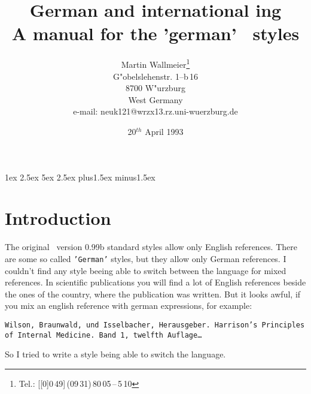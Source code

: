 

\def\tex{{\the\textfont0\TeX}}
\def\pLaTeX{{\the\textfont0 L\kern-.36em\raise.3ex\hbox{\the\scriptfont0 
A}\kern-.15em    T\kern-.1667em\lower.7ex\hbox{E}\kern-.125emX}}
\def\LaTeX{\protect\pLaTeX}
\def\pBibTeX{{\the\textfont0 B\hbox{\the\scriptfont0 IB}\kern-.1em\TeX}}
\def\BibTeX{\protect\pBibTeX}
\def\bibtex{\BibTeX}\def\tex{\TeX}
\def\latex{\LaTeX}
\def\dat#1{{\tt #1}}
\def\bsl{{\tt\char'134}}   %
\def\leerz{{\tt\char'040}} %
\def\affe{\char'100}       %
  
   
 
\hoffset=-1.0in \textwidth6.4in  
  \marginparpush1ex
 \headheight2.5ex \headsep5ex 
 
\parindent0pt \parskip2.5ex plus1.5ex minus1.5ex
\renewcommand{\arraystretch}{1.2}
\renewcommand{\baselinestretch}{1.1}
\def\footnoterule{\vfill\kern-3pt \hrule width \textwidth\kern 2.6pt}
\pagestyle{headings}
\newlength{\mylena}
\originalTeX\nonfrenchspacing



\title{German and international \bibtex ing\\A manual for the 'german' \bibtex\ styles}
\author{Martin Wallmeier\thanks{Tel.: 
[[0]0\,49]\,(09\,31)\,80\,05\,--\,5\,10}\\ G"obelslehenstr. 1--b\,16\\8700 
W"urzburg\\ West Germany\\e-mail: neuk121@wrzx13.rz.uni-wuerzburg.de}
\date{20$^{th}$ April 1993}
\maketitle

\tableofcontents

\section{Introduction}

The original \bibtex\ version 0.99b standard styles allow only English 
references. There are some so called \dat{'German'} styles, but they allow 
only German references. I couldn't find any style beeing able to switch 
between the language for mixed references. In scientific publications you 
will find a lot of English references beside the ones of the country, where 
the publication was written. But it looks awful, if you mix an english 
reference with german expressions, for example:
\begin{center}\begin{minipage}{.7\textwidth}\raggedright\tt Wilson, 
Braunwald, und Isselbacher, Herausgeber. Harrison's Principles of Internal 
Medicine. Band 1, twelfth Auf{}lage\ldots\end{minipage}\end{center}
So I tried to write a style being able to switch the language.

